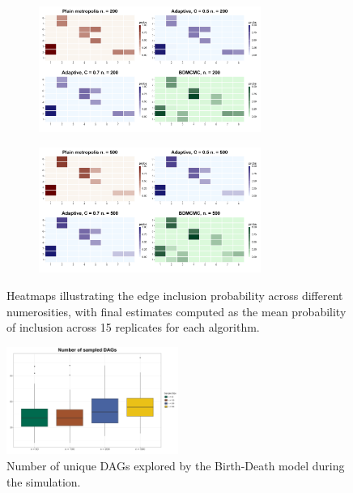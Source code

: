 \documentclass{report}
\begin{document}
\begin{figure}[!ht]
{\begin{minipage}{\textwidth}
			\begin{subfigure}[b]{0.45\textwidth}   
				\centering
				\includegraphics[height=4.1cm]{Figures/Overall_comparison/n200_heatmaps.png}
				\label{fig:heatmaps-200}
			\end{subfigure}
			\hspace{0.35cm}  %
			\begin{subfigure}[b]{0.45\textwidth}   
				\centering
				\includegraphics[height=4.1cm]{Figures/Overall_comparison/n500_heatmaps.png}
				\label{fig:heatmaps-500}
			\end{subfigure}
		\end{minipage}
	}
	\caption{Heatmaps illustrating the edge inclusion probability across different numerosities, with final estimates computed as the mean probability of inclusion across 15 replicates for each algorithm.}
	\label{fig:four-heatmaps}
\end{figure}

\begin{figure}[h] 
	\centering
	\includegraphics[width=0.5\textwidth]{Figures/Overall_comparison/Boxplot_n_dags.png}
	\caption{Number of unique DAGs explored by the Birth-Death model during the simulation.}
	\label{fig:n-dags}
\end{figure}
\end{document}

